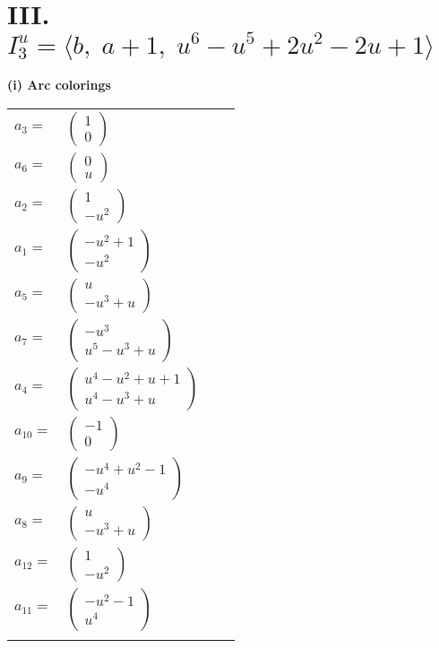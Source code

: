 \documentclass[1p]{elsarticle_modified}
\theoremstyle{definition}
\begin{document}
\centering \section*{III. $I^u_{3}= \langle b,\;a+1,\;u^6- u^5+2 u^2-2 u+1 \rangle$}
\flushleft \textbf{(i) Arc colorings}\\
\begin{tabular}{m{7pt} m{180pt} m{7pt} m{180pt} }
\flushright $a_{3}=$&$\begin{pmatrix}1\\0\end{pmatrix}$ \\
\flushright $a_{6}=$&$\begin{pmatrix}0\\u\end{pmatrix}$ \\
\flushright $a_{2}=$&$\begin{pmatrix}1\\- u^2\end{pmatrix}$ \\
\flushright $a_{1}=$&$\begin{pmatrix}- u^2+1\\- u^2\end{pmatrix}$ \\
\flushright $a_{5}=$&$\begin{pmatrix}u\\- u^3+u\end{pmatrix}$ \\
\flushright $a_{7}=$&$\begin{pmatrix}- u^3\\u^5- u^3+u\end{pmatrix}$ \\
\flushright $a_{4}=$&$\begin{pmatrix}u^4- u^2+u+1\\u^4- u^3+u\end{pmatrix}$ \\
\flushright $a_{10}=$&$\begin{pmatrix}-1\\0\end{pmatrix}$ \\
\flushright $a_{9}=$&$\begin{pmatrix}- u^4+u^2-1\\- u^4\end{pmatrix}$ \\
\flushright $a_{8}=$&$\begin{pmatrix}u\\- u^3+u\end{pmatrix}$ \\
\flushright $a_{12}=$&$\begin{pmatrix}1\\- u^2\end{pmatrix}$ \\
\flushright $a_{11}=$&$\begin{pmatrix}- u^2-1\\u^4\end{pmatrix}$\\&\end{tabular}
\end{document}
